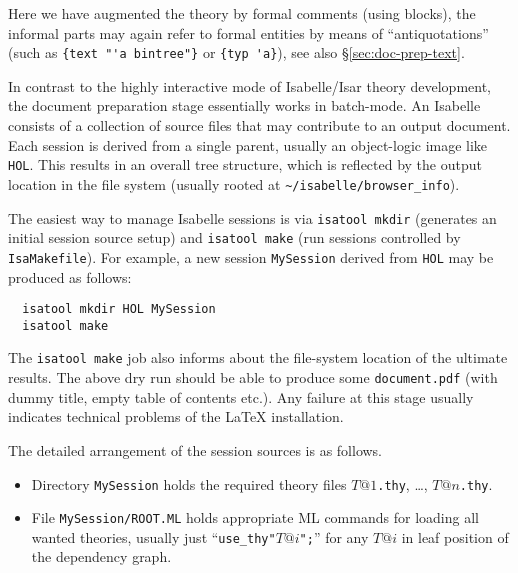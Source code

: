\begin{isabellebody}
\begin{isamarkuptext}
  \noindent Here we have augmented the theory by formal comments
  (using  blocks), the informal parts may again refer
  to formal entities by means of ``antiquotations'' (such as
  \texttt{\at}\verb,{text "'a bintree"}, or
  \texttt{\at}\verb,{typ 'a},), see also \S\ref{sec:doc-prep-text}.%
\end{isamarkuptext}%
\isamarkuptrue%
%
\isamarkuptrue%
%
\begin{isamarkuptext}%
In contrast to the highly interactive mode of Isabelle/Isar theory
  development, the document preparation stage essentially works in
  batch-mode.  An Isabelle  consists of a collection
  of source files that may contribute to an output document.  Each
  session is derived from a single parent, usually an object-logic
  image like \texttt{HOL}.  This results in an overall tree structure,
  which is reflected by the output location in the file system
  (usually rooted at \verb,~/isabelle/browser_info,).

  \medskip The easiest way to manage Isabelle sessions is via
  \texttt{isatool mkdir} (generates an initial session source setup)
  and \texttt{isatool make} (run sessions controlled by
  \texttt{IsaMakefile}).  For example, a new session
  \texttt{MySession} derived from \texttt{HOL} may be produced as
  follows:

\begin{verbatim}
  isatool mkdir HOL MySession
  isatool make
\end{verbatim}

  The \texttt{isatool make} job also informs about the file-system
  location of the ultimate results.  The above dry run should be able
  to produce some \texttt{document.pdf} (with dummy title, empty table
  of contents etc.).  Any failure at this stage usually indicates
  technical problems of the {\LaTeX} installation.

  \medskip The detailed arrangement of the session sources is as
  follows.

  \begin{itemize}

  \item Directory \texttt{MySession} holds the required theory files
  $T@1$\texttt{.thy}, \dots, $T@n$\texttt{.thy}.

  \item File \texttt{MySession/ROOT.ML} holds appropriate ML commands
  for loading all wanted theories, usually just
  ``\texttt{use_thy"$T@i$";}'' for any $T@i$ in leaf position of the
  dependency graph.


\end{itemize}
\end{isamarkuptext}
\end{isabellebody}
